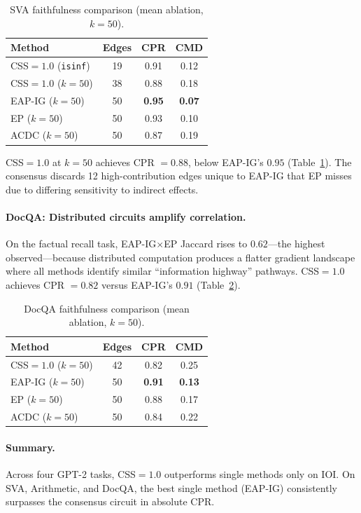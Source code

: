 \documentclass[11pt]{article}
\begin{document}
\begin{table}[h]
\centering
\caption{SVA faithfulness comparison (mean ablation, $k=50$).}
\label{tab:sva_faith}
\begin{tabular}{lccc}
\toprule
Method & Edges & CPR & CMD \\
\midrule
CSS$=1.0$ (\texttt{isinf}) & 19 & 0.91 & 0.12 \\
CSS$=1.0$ ($k=50$) & 38 & 0.88 & 0.18 \\
EAP-IG ($k=50$) & 50 & \textbf{0.95} & \textbf{0.07} \\
EP ($k=50$) & 50 & 0.93 & 0.10 \\
ACDC ($k=50$) & 50 & 0.87 & 0.19 \\
\bottomrule
\end{tabular}
\end{table}

CSS$=1.0$ at $k=50$ achieves CPR $= 0.88$, below EAP-IG's $0.95$ (Table~\ref{tab:sva_faith}). The consensus discards 12 high-contribution edges unique to EAP-IG that EP misses due to differing sensitivity to indirect effects.

\paragraph{DocQA: Distributed circuits amplify correlation.} On the factual recall task, EAP-IG$\times$EP Jaccard rises to $0.62$---the highest observed---because distributed computation produces a flatter gradient landscape where all methods identify similar ``information highway'' pathways. CSS$=1.0$ achieves CPR $= 0.82$ versus EAP-IG's $0.91$ (Table~\ref{tab:docqa}).

\begin{table}[h]
\centering
\caption{DocQA faithfulness comparison (mean ablation, $k=50$).}
\label{tab:docqa}
\begin{tabular}{lccc}
\toprule
Method & Edges & CPR & CMD \\
\midrule
CSS$=1.0$ ($k=50$) & 42 & 0.82 & 0.25 \\
EAP-IG ($k=50$) & 50 & \textbf{0.91} & \textbf{0.13} \\
EP ($k=50$) & 50 & 0.88 & 0.17 \\
ACDC ($k=50$) & 50 & 0.84 & 0.22 \\
\bottomrule
\end{tabular}
\end{table}

\paragraph{Summary.} Across four GPT-2 tasks, CSS$=1.0$ outperforms single methods only on IOI. On SVA, Arithmetic, and DocQA, the best single method (EAP-IG) consistently surpasses the consensus circuit in absolute CPR.
\end{document}
